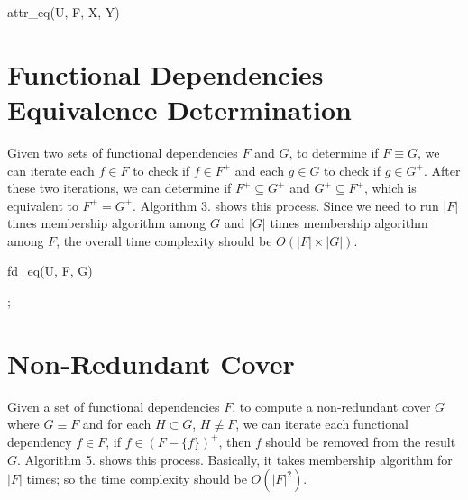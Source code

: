 \documentclass[11pt]{book}
\begin{document}
\begin{algorithm}

  \caption{attr\_eq(U, F, X, Y)}
  
  \SetAlgoLined
    
  
\end{algorithm}

\section{Functional Dependencies Equivalence Determination}

Given two sets of functional dependencies $F$ and $G$, to determine if $F \equiv G$, we can iterate each $f \in F$ to check if $f \in F^{+}$ and each $g \in G$ to check if $g \in G^{+}$. After these two iterations, we can determine if $F^{+} \subseteq G^{+}$ and $G^{+} \subseteq F^{+}$, which is equivalent to $F^{+} = G^{+}$. Algorithm 3. shows this process. Since we need to run $|F|$ times membership algorithm among $G$ and $|G|$ times membership algorithm among $F$, the overall time complexity should be $O(|F| \times |G|)$.

\begin{algorithm}

  \caption{fd\_eq(U, F, G)}
  
  \SetAlgoLined
  
  

  ;
  
\end{algorithm}

\section{Non-Redundant Cover}

Given a set of functional dependencies $F$, to compute a non-redundant cover $G$ where $G \equiv F$ and for each $H \subset G$, $H \not \equiv F$, we can iterate each functional dependency $f \in F$, if $f \in (F - \{ f \})^{+}$, then $f$ should be removed from the result $G$. Algorithm 5. shows this process. Basically, it takes membership algorithm for $|F|$ times; so the time complexity should be $O(|F|^2)$.
\end{document}
